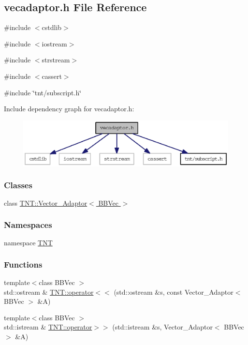 \subsection{vecadaptor.h File Reference}
\label{vecadaptor_8h}
{\ttfamily \#include $<$cstdlib$>$}\par
{\ttfamily \#include $<$iostream$>$}\par
{\ttfamily \#include $<$strstream$>$}\par
{\ttfamily \#include $<$cassert$>$}\par
{\ttfamily \#include \char`\"{}tnt/subscript.h\char`\"{}}\par
Include dependency graph for vecadaptor.h:
\nopagebreak
\begin{figure}[H]
\begin{center}
\leavevmode
\includegraphics[width=400pt]{vecadaptor_8h__incl}
\end{center}
\end{figure}
\subsubsection*{Classes}
\begin{DoxyCompactItemize}
\item 
class \hyperlink{class_t_n_t_1_1_vector___adaptor}{TNT::Vector\_\-Adaptor$<$ BBVec $>$}
\end{DoxyCompactItemize}
\subsubsection*{Namespaces}
\begin{DoxyCompactItemize}
\item 
namespace \hyperlink{namespace_t_n_t}{TNT}
\end{DoxyCompactItemize}
\subsubsection*{Functions}
\begin{DoxyCompactItemize}
\item 
{\footnotesize template$<$class BBVec $>$ }\\std::ostream \& \hyperlink{namespace_t_n_t_aa6988d477ae72113ad1fd9160fd80ff2}{TNT::operator$<$$<$} (std::ostream \&s, const Vector\_\-Adaptor$<$ BBVec $>$ \&A)
\item 
{\footnotesize template$<$class BBVec $>$ }\\std::istream \& \hyperlink{namespace_t_n_t_a6f0fa3ef7ee630fec40f163756e75137}{TNT::operator$>$$>$} (std::istream \&s, Vector\_\-Adaptor$<$ BBVec $>$ \&A)
\end{DoxyCompactItemize}
